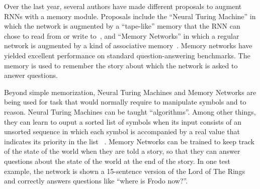 \documentclass[10pts]{article}
\begin{document}
Over the last year, several authors have made different proposals to
augment RNNs with a memory module. 
Proposals include the ``Neural Turing Machine'' in which the
network is augmented by a ``tape-like'' memory that the RNN
can chose to read from or write to~\citep{Graves-et-al-arxiv2014}, and
``Memory Networks'' in which a regular network is augmented by a
kind of associative memory~\citep{weston-memorynet-2014}. Memory
networks have yielded excellent performance on standard
question-answering benchmarks. The memory is used to remember the
story about which the network is asked to answer questions.





Beyond simple memorization, Neural Turing Machines and Memory Networks
are being used for task that would normally require to manipulate
symbols and to reason.
Neural Turing Machines can be taught ``algorithms''. Among other
things, they can learn to ouput a sorted list of symbols when its
input consists of an unsorted sequence in which each symbol is
accompanied by a real value that indicates its priority in the list
~\citep{Graves-et-al-arxiv2014}.
Memory Networks can be trained to keep track of the state of the world
when they are told a story, so that they can answer questions about
the state of the world at the end of the story. 
In one test
example, the network is shown a 15-sentence version of the Lord of The
Rings and correctly answers questions like ``where is Frodo now?''.
~\citep{weston-memorynet-2014}
\end{document}
